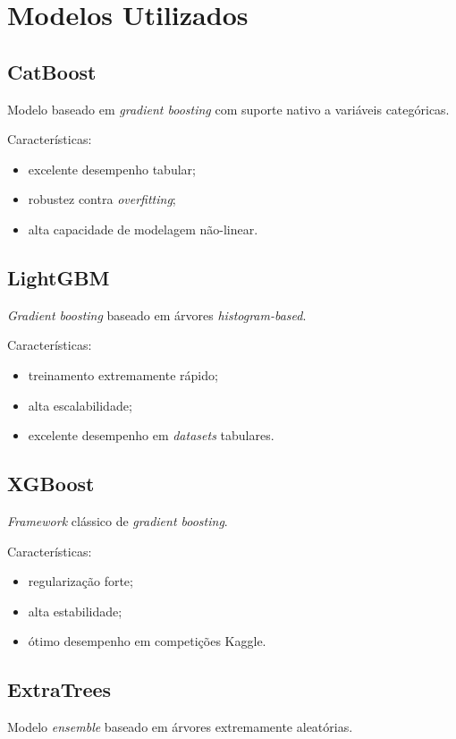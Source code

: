 \documentclass[12pt,a4paper]{article}
\begin{document}
\section{Modelos Utilizados}
\label{sec:org284bdec}
\subsection{CatBoost}
\label{sec:org78aae90}

Modelo baseado em \emph{gradient boosting} com suporte nativo a variáveis categóricas.

Características:
\begin{itemize}
\item excelente desempenho tabular;
\item robustez contra \emph{overfitting};
\item alta capacidade de modelagem não-linear.
\end{itemize}
\subsection{LightGBM}
\label{sec:orge11af59}
\emph{Gradient boosting} baseado em árvores \emph{histogram-based}.

Características:
\begin{itemize}
\item treinamento extremamente rápido;
\item alta escalabilidade;
\item excelente desempenho em \emph{datasets} tabulares.
\end{itemize}
\subsection{XGBoost}
\label{sec:orgd94003b}
\emph{Framework} clássico de \emph{gradient boosting}.

Características:
\begin{itemize}
\item regularização forte;
\item alta estabilidade;
\item ótimo desempenho em competições Kaggle.
\end{itemize}
\subsection{ExtraTrees}
\label{sec:orgce36b7f}
Modelo \emph{ensemble} baseado em árvores extremamente aleatórias.
\end{document}
